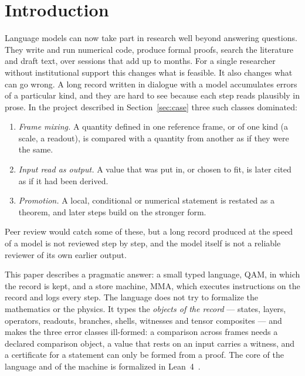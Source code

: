 \section{Introduction}\label{sec:intro}

Language models can now take part in research well beyond answering questions.  They write and run numerical code, produce formal
proofs, search the literature and draft text, over sessions that add up to months.  For a single researcher without institutional
support this changes what is feasible.  It also changes what can go wrong.  A long record written in dialogue with a model accumulates
errors of a particular kind, and they are hard to see because each step reads plausibly in prose.  In the project described in
Section~\ref{sec:case} three such classes dominated:
\begin{enumerate}
\item \emph{Frame mixing.}  A quantity defined in one reference frame, or of one kind (a scale, a readout), is compared with a quantity
from another as if they were the same.
\item \emph{Input read as output.}  A value that was put in, or chosen to fit, is later cited as if it had been derived.
\item \emph{Promotion.}  A local, conditional or numerical statement is restated as a theorem, and later steps build on the stronger form.
\end{enumerate}
Peer review would catch some of these, but a long record produced at the speed of a model is not reviewed step by step, and the model
itself is not a reliable reviewer of its own earlier output.

This paper describes a pragmatic answer: a small typed language, QAM, in which the record is kept, and a store machine, MMA, which
executes instructions on the record and logs every step.  The language does not try to formalize the mathematics or the physics.  It
types the \emph{objects of the record} --- states, layers, operators, readouts, branches, shells, witnesses and tensor composites ---
and makes the three error classes ill-formed: a comparison across frames needs a declared comparison object, a value that rests on an
input carries a witness, and a certificate for a statement can only be formed from a proof.  The core of the language and of the machine
is formalized in Lean~4~\cite{lean4}.

